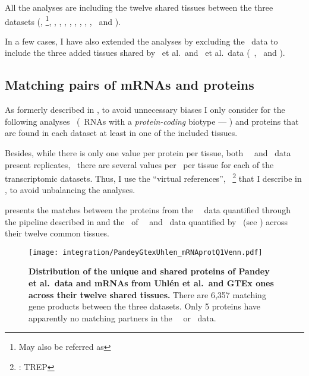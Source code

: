 All the analyses are including the twelve shared tissues between the three
datasets (\adrenal, \Bladder{}\footnote{May also
be referred as },
\hColon, \Oesophagus, \Heart,
\Kidney, \Liver, \Lung, \Ovary, \Pancreas,
\Prostate\ and \Testis).

\vspace{-1.5mm}
In a few cases, I have also extended the analyses by excluding the \gtex\ data
to include the three added tissues shared by
\pandey\ et al.\ and \uhlen\ et al.\ data (\ie\ \Gall, \Placenta\ and \Rectum).

\vspace{-2mm}
\subsection{Matching pairs of mRNAs and proteins}

\vspace{-3mm}
As formerly described in ,
to avoid unnecessary biases I only consider for the following analyses
\mRNAs\ (\ie\ \glspl{RNA} with a \emph{protein-coding} biotype --- )
and proteins that are found in each dataset at least in one of the included tissues.

Besides, while there is only one value per protein per tissue,
both \uhlen\ \etal\ and \gtex\ data present replicates,
\ie\ there are several values per \mRNA\ per tissue
for each of the transcriptomic datasets.
Thus, I use the \enquote{virtual references},
\ie\ \treps\footnote{\trep{}: \glsdesc{TREP}}
that I describe in ,
to avoid unbalancing the analyses.\\
\vspace{-\baselineskip}

 presents the matches between
the proteins from the \pandey\ \etal\ data
quantified through the pipeline described in 
and the \mRNAs\ of \uhlen\ \etal\ and \gtex\ data quantified by \htseq\
(see ) across their twelve common tissues.

\begin{figure}[!htb]
    \texttt{[image: integration/PandeyGtexUhlen\_mRNAprotQ1Venn.pdf]}\centering
    \vspace{-5mm}
    \caption[Distribution of the unique and shared proteins/mRNAs for the three datasets
    across twelve tissues]{%
    \label{fig:PGU_vennQ1}\textbf{Distribution of the unique and shared proteins
    of Pandey et al.\ data and mRNAs from Uhlén et al.\ and GTEx ones across
    their twelve shared tissues.}
    There are 6,357 matching gene products between the three datasets.
    Only 5 proteins have apparently no matching partners
    in the \uhlen\ \etal\ or \gtex\ data.}
\end{figure}

